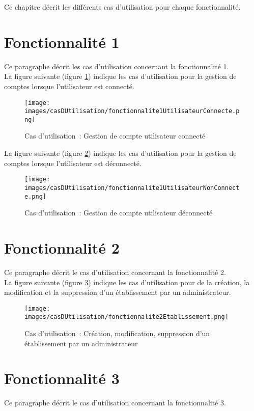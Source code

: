 Ce chapitre décrit les différents cas d'utilisation pour chaque fonctionnalité.


\section{Fonctionnalité 1}
Ce paragraphe décrit les cas d'utilisation concernant la fonctionnalité 1. \\

La figure suivante (figure \ref{diagrammeCasUtilisation1-1}) indique les cas d'utilisation pour la gestion de comptes lorsque l'utilisateur est connecté.
\begin{figure}[H]
	\centering
	\texttt{[image: images/casDUtilisation/fonctionnalite1UtilisateurConnecte.png]}
	\caption{Cas d'utilisation~: Gestion de compte utilisateur connecté }
	\label{diagrammeCasUtilisation1-1}
\end{figure}

La figure suivante (figure \ref{diagrammeCasUtilisation1-2}) indique les cas d'utilisation pour la gestion de comptes lorsque l'utilisateur est déconnecté.
\begin{figure}[H]
	\centering
	\texttt{[image: images/casDUtilisation/fonctionnalite1UtilisateurNonConnecte.png]}
	\caption{Cas d'utilisation~: Gestion de compte utilisateur déconnecté}
	\label{diagrammeCasUtilisation1-2}
\end{figure}

\section{Fonctionnalité 2}
Ce paragraphe décrit le cas d'utilisation concernant la fonctionnalité 2. \\

La figure suivante (figure \ref{diagrammeCasUtilisation2}) indique les cas d'utilisation pour de la création, la modification et la suppression d'un établissement par un administrateur.
\begin{figure}[H]
	\centering
	\texttt{[image: images/casDUtilisation/fonctionnalite2Etablissement.png]}
	\caption{Cas d'utilisation~: Création, modification, suppression d'un établissement par un administrateur}
	\label{diagrammeCasUtilisation2}
\end{figure}

\section{Fonctionnalité 3}
Ce paragraphe décrit le cas d'utilisation concernant la fonctionnalité 3. \\

